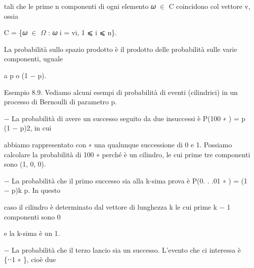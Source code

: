 \documentclass[a4paper,portrait,12pt]{article}
\begin{document}
\begin{flushleft}
tali che le prime n componenti di ogni elemento 𝜔 $\in$ C coincidono col vettore v, ossia
\end{flushleft}


\begin{flushleft}
C = \{𝜔 $\in$ $\Omega$ : 𝜔 i = vi, 1 ⩽ i ⩽ n\}.
\end{flushleft}


\begin{flushleft}
La probabilit\`{a} sullo spazio prodotto \`{e} il prodotto delle probabilit\`{a} sulle varie componenti, uguale
\end{flushleft}


\begin{flushleft}
a p o (1 $-$ p).
\end{flushleft}


\begin{flushleft}
Esempio 8.9. Vediamo alcuni esempi di probabilit\`{a} di eventi (cilindrici) in un processo di Bernoulli di parametro p.
\end{flushleft}


\begin{flushleft}
$-$ La probabilit\`{a} di avere un successo seguito da due insuccessi \`{e} P(100 ∗ ) = p (1 $-$ p)2, in cui
\end{flushleft}


\begin{flushleft}
abbiamo rappresentato con ∗ una qualunque successione di 0 e 1. Possiamo calcolare la probabilit\`{a} di 100 ∗ perch\'{e} \`{e} un cilindro, le cui prime tre componenti sono (1, 0, 0).
\end{flushleft}


\begin{flushleft}
$-$ La probabilit\`{a} che il primo successo sia alla k-sima prova \`{e} P(0. . .01 ∗ ) = (1 $-$ p)k p. In questo
\end{flushleft}


\begin{flushleft}
caso il cilindro \`{e} determinato dal vettore di lunghezza k le cui prime k $-$ 1 componenti sono 0
\end{flushleft}


\begin{flushleft}
e la k-sima \`{e} un 1.
\end{flushleft}


\begin{flushleft}
$-$ La probabilit\`{a} che il terzo lancio sia un successo. L'evento che ci interessa \`{e} \{⋅⋅1 ∗ \}, cio\`{e} due
\end{flushleft}
\end{document}
